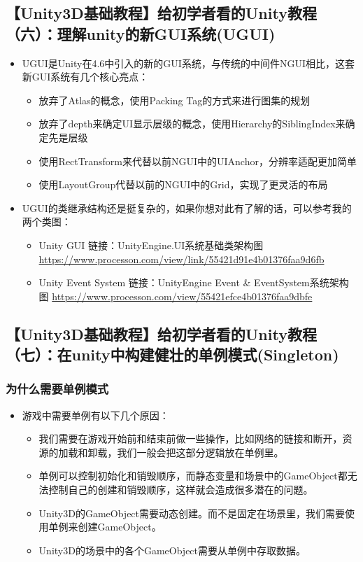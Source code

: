 \documentclass[9pt, b5paper]{article}
\begin{document}
\subsection{【Unity3D基础教程】给初学者看的Unity教程（六）：理解unity的新GUI系统(UGUI)}
\label{sec:org85dcd17}
\begin{itemize}
\item UGUI是Unity在4.6中引入的新的GUI系统，与传统的中间件NGUI相比，这套新GUI系统有几个核心亮点：
\begin{itemize}
\item 放弃了Atlas的概念，使用Packing Tag的方式来进行图集的规划
\item 放弃了depth来确定UI显示层级的概念，使用Hierarchy的SiblingIndex来确定先是层级
\item 使用RectTransform来代替以前NGUI中的UIAnchor，分辨率适配更加简单
\item 使用LayoutGroup代替以前的NGUI中的Grid，实现了更灵活的布局
\end{itemize}
\item UGUI的类继承结构还是挺复杂的，如果你想对此有了解的话，可以参考我的两个类图：
\begin{itemize}
\item Unity GUI 链接：UnityEngine.UI系统基础类架构图 \url{https://www.processon.com/view/link/55421d91e4b01376faa9d6fb}
\item Unity Event System 链接：UnityEngine Event \& EventSystem系统架构图 \url{https://www.processon.com/view/55421efce4b01376faa9dbfe}
\end{itemize}
\end{itemize}

\subsection{【Unity3D基础教程】给初学者看的Unity教程（七）：在unity中构建健壮的单例模式(Singleton)}
\label{sec:orgd657133}
\subsubsection{为什么需要单例模式}
\label{sec:org3f59f1e}
\begin{itemize}
\item 游戏中需要单例有以下几个原因：
\begin{itemize}
\item 我们需要在游戏开始前和结束前做一些操作，比如网络的链接和断开，资源的加载和卸载，我们一般会把这部分逻辑放在单例里。
\item 单例可以控制初始化和销毁顺序，而静态变量和场景中的GameObject都无法控制自己的创建和销毁顺序，这样就会造成很多潜在的问题。
\item Unity3D的GameObject需要动态创建。而不是固定在场景里，我们需要使用单例来创建GameObject。
\item Unity3D的场景中的各个GameObject需要从单例中存取数据。
\end{itemize}
\end{itemize}
\end{document}
